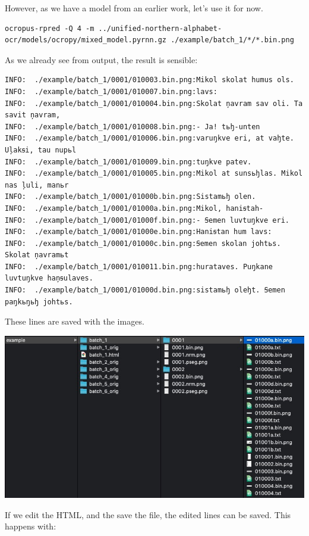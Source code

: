 \documentclass[]{book}
\begin{document}
However, as we have a model from an earlier work, let's use it for now.

\begin{verbatim}
ocropus-rpred -Q 4 -m ../unified-northern-alphabet-ocr/models/ocropy/mixed_model.pyrnn.gz ./example/batch_1/*/*.bin.png
\end{verbatim}

As we already see from output, the result is sensible:

\begin{verbatim}
INFO:  ./example/batch_1/0001/010003.bin.png:Mikol skolat humus ols.
INFO:  ./example/batch_1/0001/010007.bin.png:lavs:
INFO:  ./example/batch_1/0001/010004.bin.png:Skolat ņavram sav oli. Ta savit ņavram,
INFO:  ./example/batch_1/0001/010008.bin.png:- Ja! tьꜧ-unten
INFO:  ./example/batch_1/0001/010006.bin.png:varuŋkve eri, at vaꜧte. Uļakꞩi, tau nupьl
INFO:  ./example/batch_1/0001/010009.bin.png:tuŋkve patev.
INFO:  ./example/batch_1/0001/010005.bin.png:Mikol at sunsьꜧlas. Mikol nas ļuli, manьr
INFO:  ./example/batch_1/0001/01000b.bin.png:Sistamьꜧ olen.
INFO:  ./example/batch_1/0001/01000a.bin.png:Mikol, haniꞩtah-
INFO:  ./example/batch_1/0001/01000f.bin.png:- Ꞩemen luvtuŋkve eri.
INFO:  ./example/batch_1/0001/01000e.bin.png:Haniꞩtan hum lavs:
INFO:  ./example/batch_1/0001/01000c.bin.png:Ꞩemen skolan johtьs. Skolat ņavramьt
INFO:  ./example/batch_1/0001/010011.bin.png:hurataves. Puŋkane luvtuŋkve haņꞩulaves.
INFO:  ./example/batch_1/0001/01000d.bin.png:sistamьꜧ oleꜧt. Ꞩemen paŋkьŋьꜧ johtьs.
\end{verbatim}

These lines are saved with the images.

\includegraphics{./images/ocropy_export_from_html.jpg}

If we edit the HTML, and the save the file, the edited lines can be saved. This happens with:
\end{document}
